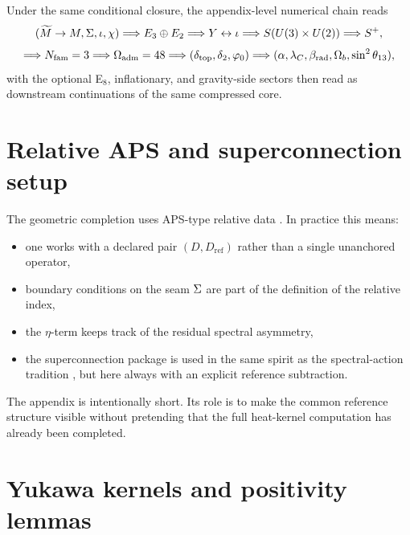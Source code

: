 \begin{remark}
Under the same conditional closure, the appendix-level numerical chain reads
\[
(\widetilde M\to M,\Sigma,\iota,\chi)
\Longrightarrow
E_3\oplus E_2
\Longrightarrow
Y \leftrightarrow \iota
\Longrightarrow
S(U(3)\times U(2))
\Longrightarrow
S^+,
\]
\[
\Longrightarrow
N_{\mathrm{fam}}=3
\Longrightarrow
\Omega_{\mathrm{adm}}=48
\Longrightarrow
(\delta_{\mathrm{top}},\delta_2,\varphi_0)
\Longrightarrow
(\alpha,\lambda_C,\beta_{\mathrm{rad}},\Omega_b,\sin^2\theta_{13}),
\]
with the optional E$_8$, inflationary, and gravity-side sectors then read as downstream continuations of the same compressed core.
\end{remark}

\section{Relative APS and superconnection setup}
\label{app:aps}

The geometric completion uses APS-type relative data \cite{aps1975}. In practice this means:
\begin{itemize}[leftmargin=1.5em, topsep=3pt, itemsep=2pt]
    \item one works with a declared pair $(D,D_{\mathrm{ref}})$ rather than a single unanchored operator,
    \item boundary conditions on the seam $\Sigma$ are part of the definition of the relative index,
    \item the $\eta$-term keeps track of the residual spectral asymmetry,
    \item the superconnection package is used in the same spirit as the spectral-action tradition \cite{chamseddineConnes1997}, but here always with an explicit reference subtraction.
\end{itemize}

The appendix is intentionally short. Its role is to make the common reference structure visible without pretending that the full heat-kernel computation has already been completed.

\section{Yukawa kernels and positivity lemmas}
\label{app:yukawa}

